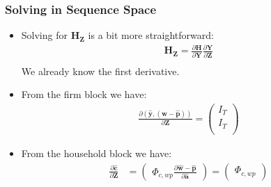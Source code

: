 \documentclass[english,xcolor=svgnames]{beamer}
\begin{document}
	\begin{frame}
		\frametitle{Solving in Sequence Space}
			\begin{itemize}
				\item Solving for $\mathbf{H}_{\mathbf{Z}}$ is a bit more straightforward:
				\begin{align*}
					\mathbf{H}_{\mathbf{Z}} = \frac{\partial \mathbf{H}}{\partial \mathbf{Y}}\frac{\partial \mathbf{Y}}{\partial \mathbf{Z}} \\
				\end{align*}
				We already know the first derivative.
				\item From the firm block we have:
				\begin{align*}
					\frac{\partial (\mathbf{\hat{y}},\mathbf{(\hat{w}-\hat{p})})}{\partial \mathbf{Z}} = \begin{pmatrix}
						I_T  \\
						I_T  \\
					\end{pmatrix}
				\end{align*}
				\item From the household block we have:
				\begin{align*}
					\frac{\partial \mathbf{\hat{c}}}{\partial \mathbf{Z}} &= \begin{pmatrix}
						\Phi_{c,wp}\frac{\partial\mathbf{\hat{w}-\hat{p}}}{\partial \mathbf{\hat{a}} } 
					\end{pmatrix} = \begin{pmatrix}
						\Phi_{c,wp} 
					\end{pmatrix}
				\end{align*}
			\end{itemize}
	\end{frame}
	
	
	
\end{document}
